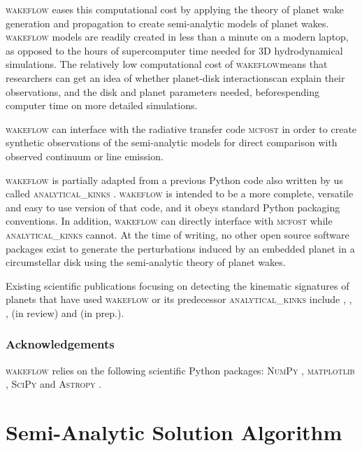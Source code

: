 \textsc{wakeflow} eases this computational cost by applying the theory of planet wake generation and propagation \citep{goldreich1979,goodman2001,rafikov2002a,bollati2021}to create semi-analytic models of planet wakes. 
\textsc{wakeflow} models are readily created in less than a minute on a modern laptop, as opposed to the hours of supercomputer time needed for 3D hydrodynamical simulations. 
The relatively low computational cost of \textsc{wakeflow}means that researchers can get an idea of whether planet-disk interactionscan explain their observations, and the disk and planet parameters needed, beforespending computer time on more detailed simulations.

\textsc{wakeflow} can interface with the radiative transfer code  \textsc{mcfost} \citep{pinte2006,pinte2009} in order to create synthetic observations of the semi-analytic models for direct comparison with observed continuum or line emission.

\textsc{wakeflow} is partially adapted from a previous Python code also written by us called \textsc{analytical\_kinks} \citep{bollati2021a}. 
\textsc{wakeflow} is intended to be a more complete, versatile and easy to use version of that code, and it obeys standard Python packaging conventions.
In addition, \textsc{wakeflow} can directly interface with \textsc{mcfost} while \textsc{analytical\_kinks} cannot.
At the time of writing, no other open source software packages exist to generate the perturbations induced by an embedded planet in a circumstellar disk using the semi-analytic theory of planet wakes.

Existing scientific publications focusing on detecting the kinematic signatures of planets that have used \textsc{wakeflow} or its predecessor \textsc{analytical\_kinks} include \citet{bollati2021}, \citet{calcino2022}, \citet{teague2022}, \citeauthor{garginreview} (in review) and \citeauthor{fasanoinprep.} (in prep.).

\subsubsection{Acknowledgements}

\textsc{wakeflow} relies on the following scientific Python packages: \textsc{NumPy} \citep{harris2020}, \textsc{matplotlib} \citep{hunter2007}, \textsc{SciPy} \citep{virtanen2020} and \textsc{Astropy} \citep{astropycollaboration2022}.

\section{Semi-Analytic Solution Algorithm}


